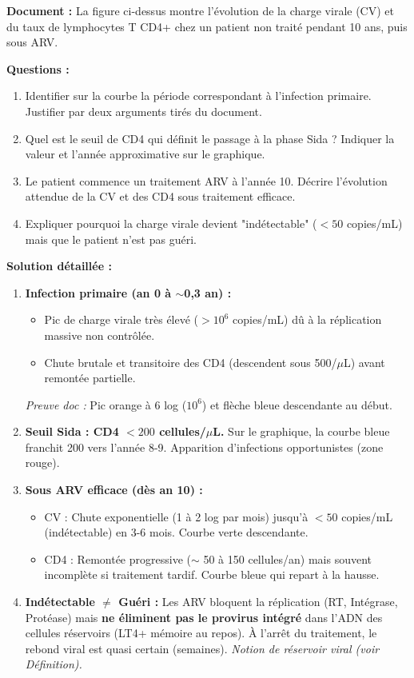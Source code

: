\documentclass[11pt]{article}
\begin{document}
\begin{exoresolu}
\textbf{Document :} La figure ci-dessus montre l'évolution de la charge virale (CV) et du taux de lymphocytes T CD4+ chez un patient non traité pendant 10 ans, puis sous ARV.

\textbf{Questions :}
\begin{enumerate}
\item Identifier sur la courbe la période correspondant à l'infection primaire. Justifier par deux arguments tirés du document.
\item Quel est le seuil de CD4 qui définit le passage à la phase Sida ? Indiquer la valeur et l'année approximative sur le graphique.
\item Le patient commence un traitement ARV à l'année 10. Décrire l'évolution attendue de la CV et des CD4 sous traitement efficace.
\item Expliquer pourquoi la charge virale devient "indétectable" ($< 50$ copies/mL) mais que le patient n'est pas guéri.
\end{enumerate}

\tcblower
\textbf{Solution détaillée :}
\begin{enumerate}
\item \textbf{Infection primaire (an 0 à $\sim$0,3 an) :} 
    \begin{itemize}
    \item Pic de charge virale très élevé ($> 10^6$ copies/mL) dû à la réplication massive non contrôlée.
    \item Chute brutale et transitoire des CD4 (descendent sous 500/$\mu$L) avant remontée partielle.
    \end{itemize}
    \textit{Preuve doc :} Pic orange à 6 log ($10^6$) et flèche bleue descendante au début.
\item \textbf{Seuil Sida : CD4 $< 200$ cellules/$\mu$L.} Sur le graphique, la courbe bleue franchit 200 vers l'année 8-9. Apparition d'infections opportunistes (zone rouge).
\item \textbf{Sous ARV efficace (dès an 10) :}
    \begin{itemize}
    \item CV : Chute exponentielle (1 à 2 log par mois) jusqu'à $< 50$ copies/mL (indétectable) en 3-6 mois. Courbe verte descendante.
    \item CD4 : Remontée progressive ($\sim$ 50 à 150 cellules/an) mais souvent incomplète si traitement tardif. Courbe bleue qui repart à la hausse.
    \end{itemize}
\item \textbf{Indétectable $\neq$ Guéri :} Les ARV bloquent la réplication (RT, Intégrase, Protéase) mais \textbf{ne éliminent pas le provirus intégré} dans l'ADN des cellules réservoirs (LT4+ mémoire au repos). À l'arrêt du traitement, le rebond viral est quasi certain (semaines). \textit{Notion de réservoir viral (voir Définition).}
\end{enumerate}
\end{exoresolu}
\end{document}
